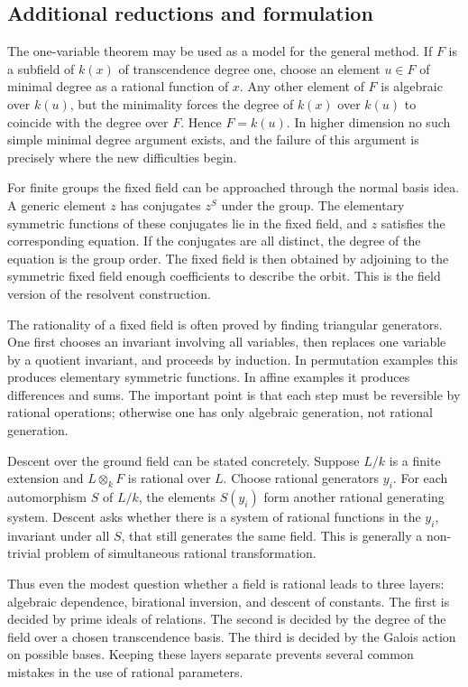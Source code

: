 \documentclass[11pt]{article}
\begin{document}
\subsection{Additional reductions and formulation}

The one-variable theorem may be used as a model for the general method. If \(F\) is a subfield of
\(k(x)\) of transcendence degree one, choose an element \(u\in F\) of minimal degree as a rational
function of \(x\). Any other element of \(F\) is algebraic over \(k(u)\), but the minimality forces
the degree of \(k(x)\) over \(k(u)\) to coincide with the degree over \(F\). Hence \(F=k(u)\). In
higher dimension no such simple minimal degree argument exists, and the failure of this argument is
precisely where the new difficulties begin.

For finite groups the fixed field can be approached through the normal basis idea. A generic element
\(z\) has conjugates \(z^S\) under the group. The elementary symmetric functions of these conjugates
lie in the fixed field, and \(z\) satisfies the corresponding equation. If the conjugates are all
distinct, the degree of the equation is the group order. The fixed field is then obtained by
adjoining to the symmetric fixed field enough coefficients to describe the orbit. This is the field
version of the resolvent construction.

The rationality of a fixed field is often proved by finding triangular generators. One first chooses
an invariant involving all variables, then replaces one variable by a quotient invariant, and
proceeds by induction. In permutation examples this produces elementary symmetric functions. In
affine examples it produces differences and sums. The important point is that each step must be
reversible by rational operations; otherwise one has only algebraic generation, not rational
generation.

Descent over the ground field can be stated concretely. Suppose \(L/k\) is a finite extension and
\(L\otimes_k F\) is rational over \(L\). Choose rational generators \(y_i\). For each automorphism
\(S\) of \(L/k\), the elements \(S(y_i)\) form another rational generating system. Descent asks
whether there is a system of rational functions in the \(y_i\), invariant under all \(S\), that
still generates the same field. This is generally a non-trivial problem of simultaneous rational
transformation.

Thus even the modest question whether a field is rational leads to three layers: algebraic
dependence, birational inversion, and descent of constants. The first is decided by prime ideals of
relations. The second is decided by the degree of the field over a chosen transcendence basis. The
third is decided by the Galois action on possible bases. Keeping these layers separate prevents
several common mistakes in the use of rational parameters.
\end{document}
